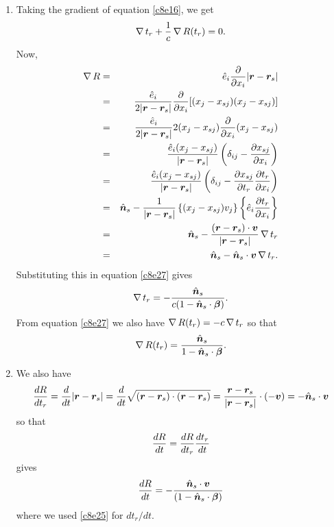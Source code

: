 \begin{enumerate}
\item Taking the gradient of equation \eqref{c8e16}, we get
\begin{equation}\label{c8e27}
\operatorname{\nabla} t_r + \frac{1}{c}\operatorname{\nabla} R(t_r) = 0.
\end{equation}
Now,
\begin{eqnarray*}
\operatorname{\nabla} R &=& \hat{e}_i\frac{\partial}{\partial x_i}|\bm{r} - \bm{r}_s| \\
 &=& \frac{\hat{e}_i}{2|\bm{r}-\bm{r}_s|}\frac{\partial}{\partial x_i}
 [(x_j - x_{sj})(x_j - x_{sj})] \\
 &=& \frac{\hat{e}_i}{2|\bm{r}-\bm{r}_s|}2(x_j - x_{sj})
 \frac{\partial}{\partial x_i}(x_j - x_{sj}) \\
 &=& \frac{\hat{e}_i(x_j - x_{sj})}{|\bm{r}-\bm{r}_s|}\left(\delta_{ij} - 
 \frac{\partial{x_{sj}}}{\partial{x_i}}\right) \\
 &=& \frac{\hat{e}_i(x_j - x_{sj})}{|\bm{r}-\bm{r}_s|}\left(\delta_{ij} - 
 \frac{\partial{x_{sj}}}{\partial{t_r}}\frac{\partial{t_r}}{\partial{x_i}}\right) \\
 &=& \hat{\bm{n}}_s - \frac{1}{|\bm{r} - \bm{r}_s|}\left\{(x_j - x_{sj})v_j\right\}
 \left\{\hat{e}_i\frac{\partial{t_r}}{\partial{x_i}}\right\} \\
 &=& \hat{\bm{n}}_s - \frac{(\bm{r} - \bm{r}_s)\cdot\bm{v}}{|\bm{r} - \bm{r}_s|}
 \operatorname{\nabla} t_r \\
 &=& \hat{\bm{n}}_s - \hat{\bm{n}}_s\cdot\bm{v} \operatorname{\nabla} t_r.
\end{eqnarray*}
Substituting this in equation \eqref{c8e27} gives
\begin{equation}\label{c8e28}
\operatorname{\nabla} t_r = -\frac{\hat{\bm{n}}_s}{c(1 - \hat{\bm{n}}_s\cdot\bm{\beta})}.
\end{equation}
From equation \eqref{c8e27} we also have $\operatorname{\nabla} R(t_r) = -c\operatorname{\nabla} t_r$ so that
\begin{equation}\label{c8e29}
\operatorname{\nabla} R(t_r) = \frac{\hat{\bm{n}}_s}{1 - \hat{\bm{n}}_s\cdot\bm{\beta}}.
\end{equation}


\item We also have
\[
\frac{d{R}}{d{t_r}} = \frac{d}{dt}|\bm{r} - \bm{r}_s| = 
\frac{d}{dt}\sqrt{(\bm{r} - \bm{r}_s)\cdot(\bm{r} - \bm{r}_s)}
= \frac{\bm{r} - \bm{r}_s}{|\bm{r} - \bm{r}_s|}\cdot(-\bm{v})
= -\hat{\bm{n}}_s\cdot\bm{v}
\]
so that
\[
\frac{d{R}}{d{t}} = \frac{d{R}}{d{t_r}}\frac{d{t_r}}{d{t}}
\]
gives
\begin{equation}\label{c8e30}
\frac{d{R}}{d{t}} = -\frac{\hat{\bm{n}}_s\cdot\bm{v}}{(1 - \hat{\bm{n}}_s\cdot\bm{\beta})}
\end{equation}
where we used \eqref{c8e25} for $dt_r/dt$.


\end{enumerate}
